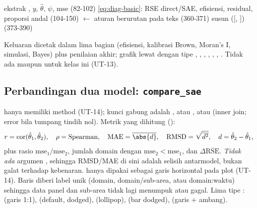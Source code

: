 \begin{algorithm}[htbp]
\caption{\texttt{diagnose} --- alur sebenarnya (\texttt{R/diagnose.R:73-410})}\label{alg:diagnose}
ekstrak , $y$, $\hat\theta$, $\psi$, $\mathrm{mse}$ (82-102)\;
\eqref{eq:diag-basic}: RSE direct/SAE, efisiensi, residual, proporsi andal (104-150)\;
\;
\;
\;
\;
 $\leftarrow$ aturan berurutan pada teks (360-371)\;
susun  ([, ]) (373-390)\;
\end{algorithm}

Keluaran dicetak  dalam lima bagian (efisiensi,
kalibrasi Brown, Moran's I, simulasi, Bayes) plus penilaian akhir; grafik
lewat  dengan tipe , ,
, , , , .
Tidak ada  maupun  untuk kelas ini (UT-13).

\subsection{Perbandingan dua model: \texttt{compare\_sae}}\label{sec:compare}

 hanya
memiliki method  (UT-14); kunci gabung adalah
, atau , atau 
(inner join; error bila tumpang tindih nol). Metrik yang dihitung
():
\begin{equation}
  r=\operatorname{cor}(\hat\theta_1,\hat\theta_2),\quad
  \rho=\text{Spearman},\quad
  \mathrm{MAE}=\overline{\abs{d}},\quad
  \mathrm{RMSD}=\sqrt{\overline{d^{2}}},\quad
  d=\hat\theta_2-\hat\theta_1,
  \label{eq:compare-metrics}
\end{equation}
plus rasio $\mathrm{mse}_1/\mathrm{mse}_2$, jumlah domain dengan
$\mathrm{mse}_2<\mathrm{mse}_1$, dan $\Delta\overline{\mathrm{RSE}}$.
\emph{Tidak ada} argumen , sehingga RMSD/MAE di sini adalah
selisih antarmodel, bukan galat terhadap kebenaran.
 hanya dipakai sebagai garis horizontal pada plot
 (UT-14). Baris diberi label unik (domain, domain/sub-area, atau
domain:waktu) sehingga data panel dan sub-area tidak lagi menumpuk atau gagal.
Lima tipe :  (garis 1:1),
 (default, dodged),  (lollipop),
 (bar dodged),  (garis + ambang).

